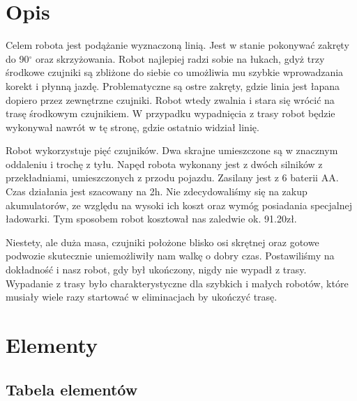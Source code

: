 \documentclass[a4paper,11pt]{article}
\begin{document}
\tableofcontents

\listoffigures

\section{Opis}
Celem robota jest podążanie wyznaczoną linią. Jest w stanie pokonywać zakręty do 90$^\circ$ oraz skrzyżowania. Robot najlepiej radzi sobie na łukach, gdyż trzy środkowe czujniki są zbliżone do siebie co umożliwia mu szybkie wprowadzania korekt i płynną jazdę. Problematyczne są ostre zakręty, gdzie linia jest łapana dopiero przez zewnętrzne czujniki. Robot wtedy zwalnia i stara się wrócić na trasę środkowym czujnikiem. W przypadku wypadnięcia z trasy robot będzie wykonywał nawrót w tę stronę, gdzie ostatnio widział linię.

Robot wykorzystuje pięć czujników. Dwa skrajne umieszczone są w znacznym oddaleniu i trochę z tyłu.
Napęd robota wykonany jest z dwóch silników z przekładniami, umieszczonych z przodu pojazdu. Zasilany jest z 6 baterii AA. Czas działania jest szacowany na 2h. Nie zdecydowaliśmy się na zakup akumulatorów, ze względu na wysoki ich koszt oraz wymóg posiadania specjalnej ładowarki. Tym sposobem robot kosztował nas zaledwie ok. 91.20zł.

Niestety, ale duża masa, czujniki położone blisko osi skrętnej oraz gotowe podwozie skutecznie uniemożliwiły nam walkę o dobry czas. Postawiliśmy na dokładność i nasz robot, gdy był ukończony, nigdy nie wypadł z trasy. Wypadanie z trasy było charakterystyczne dla szybkich i małych robotów, które musiały wiele razy startować w eliminacjach by ukończyć trasę.

\section{Elementy}
\subsection{Tabela elementów}
\end{document}
